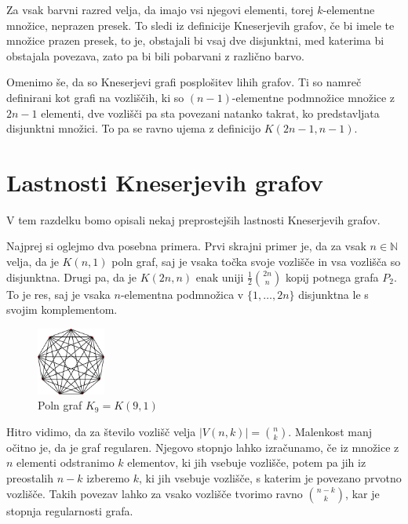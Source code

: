 \documentclass[a4paper,12pt]{article}
\begin{document}
Za vsak barvni razred velja, da imajo vsi njegovi elementi, torej $k$-elementne množice, neprazen presek. To sledi iz definicije Kneserjevih grafov, če bi imele te množice prazen presek, to je, obstajali bi vsaj dve disjunktni, med katerima bi obstajala povezava, zato pa bi bili pobarvani z različno barvo.

Omenimo še, da so Kneserjevi grafi posplošitev lihih grafov. Ti so namreč definirani kot grafi na vozliščih, ki so $(n-1)$-elementne podmnožice množice z $2n-1$ elementi, dve vozlišči pa sta povezani natanko takrat, ko predstavljata disjunktni množici. To pa se ravno ujema z definicijo $K(2n-1,n-1)$.


\newpage
\section{Lastnosti Kneserjevih grafov}

V tem razdelku bomo opisali nekaj preprostejših lastnosti Kneserjevih grafov.

Najprej si oglejmo dva posebna primera. Prvi skrajni primer je, da za vsak $n \in \mathbb{N}$ velja, da je $K(n,1)$ poln graf, saj je vsaka točka svoje vozlišče in vsa vozlišča so disjunktna. Drugi pa, da je $K(2n,n)$ enak uniji $\frac{1}{2} {{2n}\choose{n}}$ kopij potnega grafa $P_2$. To je res, saj je vsaka $n$-elementna podmnožica v $\{1,\ldots,2n\}$ disjunktna le s svojim komplementom.

\begin{figure}[h!]
\centering
\includegraphics[width=0.2\textwidth]{poln_graf}
\caption{Poln graf $K_9=K(9,1)$}
\end{figure}

Hitro vidimo, da za število vozlišč velja $|V(n,k)|={{n}\choose{k}}$. Malenkost manj očitno je, da je graf regularen. Njegovo stopnjo lahko izračunamo, če iz množice z $n$ elementi odstranimo $k$ elementov, ki jih vsebuje vozlišče, potem pa jih iz preostalih $n-k$ izberemo $k$, ki jih vsebuje vozlišče, s katerim je povezano prvotno vozlišče. Takih povezav lahko za vsako vozlišče tvorimo ravno ${n-k}\choose{k}$, kar je stopnja regularnosti grafa.
\end{document}
